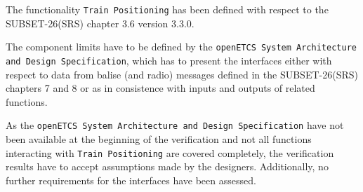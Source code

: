 The functionality \texttt{Train Positioning} has been defined with respect to the SUBSET-26(SRS) chapter 3.6 version 3.3.0. 

The component limits have to be defined by the \texttt{openETCS System Architecture and Design Specification}, which has to present the interfaces either with respect to data from balise (and radio) messages defined in the SUBSET-26(SRS) chapters 7 and 8 or as in consistence with inputs and outputs of related functions. 

As the \texttt{openETCS System Architecture and Design Specification} have not been available at the beginning of the verification and not all functions interacting with \texttt{Train Positioning} are covered completely, the verification results have to accept assumptions made by the designers. Additionally, no further requirements for the interfaces have been assessed.